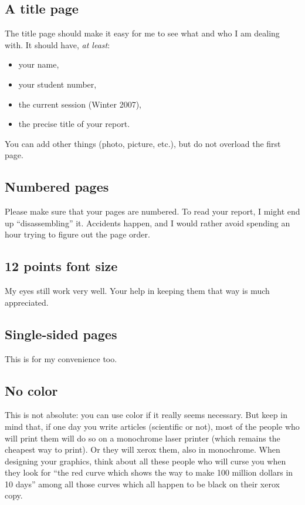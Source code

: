 \documentclass[12pt]{article}
\begin{document}
\subsection{A title page}
The title page should make it easy for me to see what and who I am dealing with. It should have, \emph{at least}:
\begin{itemize}
\item your name,
\item your student number,
\item the current session (Winter 2007),
\item the precise title of your report.
\end{itemize}
You can add other things (photo, picture, etc.), but do not overload the first page.

\subsection{Numbered pages}
Please make sure that your pages are numbered. To read your report, I might end up ``disassembling'' it. Accidents happen, and I would rather avoid spending an hour trying to figure out the page order.

\subsection{12 points font size}
My eyes still work very well. Your help in keeping them that way is much appreciated.

\subsection{Single-sided pages}
This is for my convenience too.

\subsection{No color}
This is not absolute: you can use color if it really seems necessary. But keep in mind that, if one day you write articles (scientific or not), most of the people who will print them will do so on a monochrome laser printer (which remains the cheapest way to print). Or they will xerox them, also in monochrome. When designing your graphics, think about all these people who will curse you when they look for ``the red curve which shows the way to make 100 million dollars in 10 days'' among all those curves which all happen to be black on their xerox copy.
\end{document}
